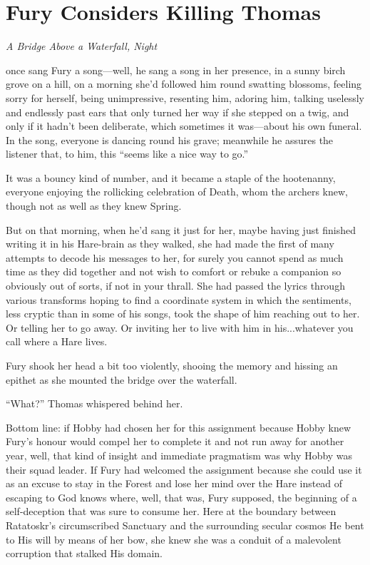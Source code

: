 \documentclass[11pt,a5paper]{article}
\newcommand{\alet}[1]{\textit{#1}\vspace{1em}}
\begin{document}
\newpage

\section{Fury Considers Killing Thomas}

\alet{A Bridge Above a Waterfall, Night}

 once sang Fury a song---well, he sang a song in her presence, in a sunny birch grove on a hill, on a morning she'd followed him round swatting blossoms, feeling sorry for herself, being unimpressive, resenting him, adoring him, talking uselessly and endlessly past ears that only turned her way if she stepped on a twig, and only if it hadn't been deliberate, which sometimes it was---about his own funeral. In the song, everyone is dancing round his grave; meanwhile he assures the listener that, to him, this ``seems like a nice way to go.''

It was a bouncy kind of number, and it became a staple of the hootenanny, everyone enjoying the rollicking celebration of Death, whom the archers knew, though not as well as they knew Spring.

But on that morning, when he'd sang it just for her, maybe having just finished writing it in his Hare-brain as they walked, she had made the first of many attempts to decode his messages to her, for surely you cannot spend as much time as they did together and not wish to comfort or rebuke a companion so obviously out of sorts, if not in your thrall. She had passed the lyrics through various transforms hoping to find a coordinate system in which the sentiments, less cryptic than in some of his songs, took the shape of him reaching out to her. Or telling her to go away. Or inviting her to live with him in his...whatever you call where a Hare lives.

Fury shook her head a bit too violently, shooing the memory and hissing an epithet as she mounted the bridge over the waterfall.

``What?'' Thomas whispered behind her.

Bottom line: if Hobby had chosen her for this assignment because Hobby knew Fury's honour would compel her to complete it and not run away for another year, well, that kind of insight and immediate pragmatism was why Hobby was their squad leader. If Fury had welcomed the assignment because she could use it as an excuse to stay in the Forest and lose her mind over the Hare instead of escaping to God knows where, well, that was, Fury supposed, the beginning of a self-deception that was sure to consume her. Here at the boundary between Ratatoskr's circumscribed Sanctuary and the surrounding secular cosmos He bent to His will by means of her bow, she knew she was a conduit of a malevolent corruption that stalked His domain.
\end{document}
